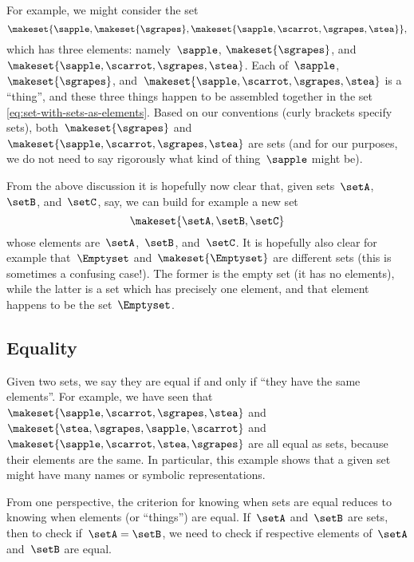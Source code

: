 For example, we might consider the set
%
\begin{equation}
    \label{eq:set-with-sets-as-elements}
    \makeset{ \sapple, \makeset{ \sgrapes }, \makeset{ \sapple, \scarrot, \sgrapes, \stea } },
\end{equation}
%
which has three elements: namely~$\sapple$, $\makeset{ \sgrapes }$, and~$\makeset{ \sapple, \scarrot, \sgrapes, \stea }$.
Each of~$\sapple$, $\makeset{ \sgrapes }$, and~$\makeset{ \sapple, \scarrot, \sgrapes, \stea }$ is a ``thing'', and these three things happen to be assembled together in the set \cref{eq:set-with-sets-as-elements}.
Based on our conventions (curly brackets specify sets), both~$\makeset{ \sgrapes }$ and~$\makeset{ \sapple, \scarrot, \sgrapes, \stea }$ are sets (and for our purposes, we do not need to say rigorously what kind of thing~$\sapple$ might be).

From the above discussion it is hopefully now clear that, given sets~$\setA$,~$\setB$, and~$\setC$, say, we can build for example a new set
\begin{equation}
    \makeset{ \setA, \setB, \setC }
\end{equation}
whose elements are~$\setA$,~$\setB$, and~$\setC$.
It is hopefully also clear for example that~$\Emptyset$ and~$\makeset{ \Emptyset }$ are different sets (this is sometimes a confusing case!).
The former is the empty set (it has no elements), while the latter is a set which has precisely one element, and that element happens to be the set~$\Emptyset$.

\subsection{Equality}

Given two sets, we say they are equal if and only if ``they have the same elements''.
For example, we have seen that~$\makeset{ \sapple, \scarrot, \sgrapes, \stea }$ and~$\makeset{ \stea, \sgrapes, \sapple, \scarrot}$ and~$\makeset{ \sapple, \scarrot, \stea, \sgrapes }$ are all equal as sets, because their elements are the same.
In particular, this example shows that a given set might have many names or symbolic representations.

From one perspective, the criterion for knowing when sets are equal reduces to knowing when elements (or ``things'') are equal.
If~$\setA$ and~$\setB$ are sets, then to check if~$\setA = \setB$, we need to check if respective elements of~$\setA$ and~$\setB$ are equal.

